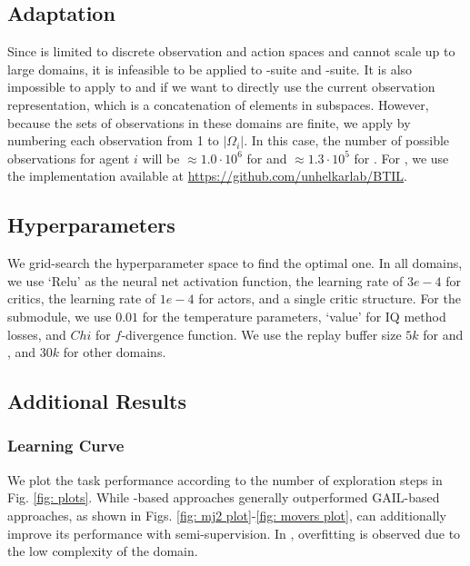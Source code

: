 \subsection{\btil Adaptation}
Since \btil is limited to discrete observation and action spaces and cannot scale up to large domains, it is infeasible to be applied to \simplemulti-suite and \smactwo-suite. It is also impossible to apply \btil to   \movers and \rescue if we want to directly use the current observation representation, which is a concatenation of elements in subspaces. However, because the sets of observations in these domains are finite, we apply \btil by numbering each observation from 1 to $|\Omega_i|$. In this case, the number of possible observations for agent $i$ will be $\approx 1.0 \cdot 10^6$ for \movers and $\approx 1.3 \cdot 10^5$ for \rescue. For \btil, we use the implementation available at  \url{https://github.com/unhelkarlab/BTIL}\cite{seo2022semi}.

\subsection{Hyperparameters}
We grid-search the hyperparameter space to find the optimal one. In all domains, we use `Relu' as the neural net activation function, the learning rate of $3e-4$ for critics, the learning rate of $1e-4$ for actors, and a single critic structure. For the \iql submodule, we use $0.01$ for the temperature parameters, `value' for IQ method losses, and $Chi$ for $f$-divergence function. We use the replay buffer size $5k$ for \movers and \rescue, and $30k$ for other domains. 




\subsection{Additional Results}
\subsubsection{Learning Curve}
We plot the task performance according to the number of exploration steps in Fig. \ref{fig: plots}. While \iql-based approaches generally outperformed GAIL-based approaches, as shown in Figs. \ref{fig: mj2 plot}-\ref{fig: movers plot}, \ouralg can additionally improve its performance with semi-supervision. In \rescue, overfitting is observed due to the low complexity of the domain.

